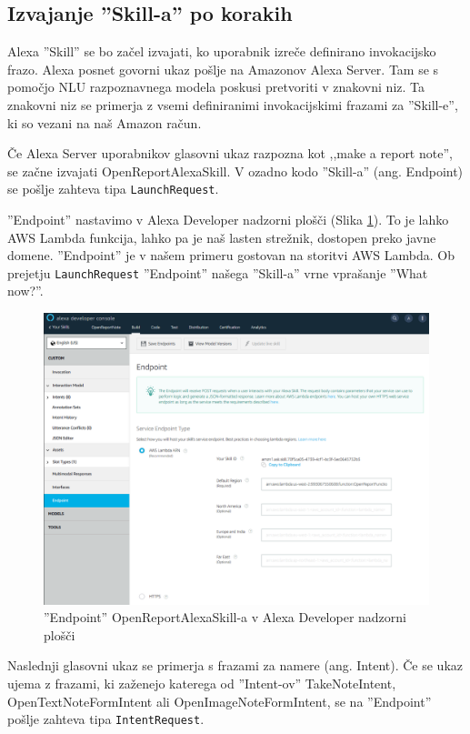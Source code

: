 \documentclass[a4paper, 12pt]{book}
\begin{document}
\subsection{Izvajanje ''Skill-a'' po korakih}

Alexa ''Skill'' se bo začel izvajati, ko uporabnik izreče definirano invokacijsko frazo.
Alexa posnet govorni ukaz pošlje na Amazonov Alexa Server.
Tam se s pomočjo NLU razpoznavnega modela poskusi pretvoriti v znakovni niz.
Ta znakovni niz se primerja z vsemi definiranimi invokacijskimi frazami za ''Skill-e'', ki so vezani na naš Amazon račun.

Če Alexa Server uporabnikov glasovni ukaz razpozna kot ,,make a report note'', se začne izvajati OpenReportAlexaSkill.
V ozadno kodo ''Skill-a'' (ang. Endpoint) se pošlje zahteva tipa \texttt{LaunchRequest}.

''Endpoint'' nastavimo v Alexa Developer nadzorni plošči (Slika \ref{skill_endpoint}).
To je lahko AWS Lambda funkcija, lahko pa je naš lasten strežnik, dostopen preko javne domene.
''Endpoint'' je v našem primeru gostovan na storitvi AWS Lambda.
Ob prejetju \texttt{LaunchRequest} ''Endpoint'' našega ''Skill-a'' vrne vprašanje ''What now?''.

\begin{figure}[H]
\begin{center}
\includegraphics[width=13cm]{skill_endpoint}
\end{center}
\caption{''Endpoint'' OpenReportAlexaSkill-a v Alexa Developer nadzorni plošči}
\label{skill_endpoint}
\end{figure}

Naslednji glasovni ukaz se primerja s frazami za namere (ang. Intent).
Če se ukaz ujema z frazami, ki zaženejo katerega od ''Intent-ov'' TakeNoteIntent, OpenTextNoteFormIntent ali OpenImageNoteFormIntent, se na ''Endpoint'' pošlje zahteva tipa \texttt{IntentRequest}.
\end{document}

